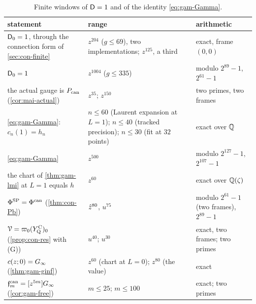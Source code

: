 \begin{table}[ht]
\centering\small
\begin{tabular}{>{\raggedright\arraybackslash}p{}|>{\raggedright\arraybackslash}p{}|>{\raggedright\arraybackslash}p{}}
statement & range & arithmetic\\ \hline
$\mathsf{D}_0=1$, through the connection form of \cref{sec:con-finite} & $z^{204}$ ($g\leq 69$), two implementations; $z^{125}$, a third & exact, frame $(0,0)$\\
$\mathsf{D}_0=1$ & $z^{1004}$ ($g\leq 335$) & modulo $2^{89}-1$, $2^{61}-1$\\
the actual gauge is $P_{\mathrm{can}}$ (\cref{cor:mai-actual}) & $z^{35}$; $z^{150}$ & two primes, two frames\\
\eqref{eq:gam-Gamma}: $c_n(1)=h_n$ & $n\leq 60$ (Laurent expansion at $L=1$); $n\leq 40$ (tracked precision); $n\leq 30$ (fit at $32$ points) & exact over $\mathbb{Q}$\\
\eqref{eq:gam-Gamma} & $z^{500}$ & modulo $2^{127}-1$, $2^{107}-1$\\
the chart of \cref{thm:gam-lmi} at $L=1$ equals $h$ & $z^{60}$ & exact over $\mathbb{Q}(\zeta)$\\
$\Phi^{\mathrm{SP}}=\Phi^{\mathrm{can}}$ (\cref{thm:con-Pb}) & $\hat{z}^{80}$, $u^{75}$ & modulo $2^{61}-1$ (two frames), $2^{89}-1$\\
$\mathcal{V}=\varpi_0(Y^{\mathrm{C}}_{\mathrm{Q}})_0$ (\cref{prop:con-res} with (G)) & $u^{40}$; $u^{30}$ & exact, two frames; two primes\\
$c(z;0)=G_{\infty}$ (\cref{thm:gam-ginf}) & $z^{60}$ (chart at $L=0$); $z^{80}$ (the value) & exact\\
$\mathfrak{f}^{\mathrm{can}}_m=[z^{5m}]G_{\infty}$ (\cref{cor:gam-free}) & $m\leq 25$; $m\leq 100$ & exact; two primes\\
\end{tabular}
\caption{Finite windows of $\mathsf{D}=1$ and of the identity \eqref{eq:gam-Gamma}.}
\label{tab:evi-windows}
\end{table}

